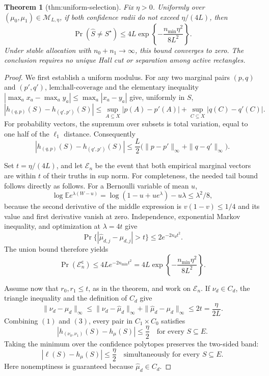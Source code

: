 \documentclass{article}
\newtheorem{theorem}{Theorem}
\begin{document}
\begin{theorem}[thm:uniform-selection]\label{thm:uniform-selection}
Fix \(\eta>0\). Uniformly over \((\mu_0,\mu_1)\in\mathcal M_{L,\eta}\), if both confidence radii do not exceed \(\eta/(4L)\), then \[\Pr(\widehat S\neq S^\star)\leq4L\exp\!\left\{-\frac{n_{\min}\eta^2}{8L^2}\right\}.\] Under stable allocation with \(n_0+n_1\to\infty\), this bound converges to zero. The conclusion requires no unique Hall cut or separation among active rectangles.
\end{theorem}
\begin{proof}
We first establish a uniform modulus.  For any two marginal pairs \((p,q)\) and \((p',q')\), \(\text{lem:hall-coverage}\) and the elementary inequality \(|\max_a x_a-\max_a y_a|\leq\max_a|x_a-y_a|\) give, uniformly in \(S\),
\[
|h_{(q,p)}(S)-h_{(q',p')}(S)|
\leq \sup_{A\subseteq X}|p(A)-p'(A)|
+\sup_{C\subseteq X}|q(C)-q'(C)|.
\]
For probability vectors, the supremum over subsets is total variation, equal to one half of the \(\ell_1\) distance.  Consequently
\[
|h_{(q,p)}(S)-h_{(q',p')}(S)|
\leq\frac L2\bigl(\|p-p'\|_\infty+\|q-q'\|_\infty\bigr). \tag{1}
\]

Set \(t=\eta/(4L)\), and let \(\mathcal E_n\) be the event that both empirical marginal vectors are within \(t\) of their truths in sup norm.  For completeness, the needed tail bound follows directly as follows.  For a Bernoulli variable of mean \(u\),
\[
\log\mathbb E e^{\lambda(W-u)}
=\log(1-u+ue^\lambda)-u\lambda\leq\lambda^2/8,
\]
because the second derivative of the middle expression is \(v(1-v)\leq1/4\) and its value and first derivative vanish at zero.  Independence, exponential Markov inequality, and optimization at \(\lambda=4t\) give
\[
\Pr\{|\widehat\mu_{d,j}-\mu_{d,j}|>t\}\leq2e^{-2n_dt^2}.
\]
The union bound therefore yields
\[
\Pr(\mathcal E_n^{\mathsf c})
\leq4L e^{-2n_{\min}t^2}
=4L\exp\!\left\{-\frac{n_{\min}\eta^2}{8L^2}\right\}. \tag{2}
\]

Assume now that \(r_0,r_1\leq t\), as in the theorem, and work on \(\mathcal E_n\).  If \(\nu_d\in C_d\), the triangle inequality and the definition of \(C_d\) give
\[
\|\nu_d-\mu_d\|_\infty
\leq\|\nu_d-\widehat\mu_d\|_\infty
+\|\widehat\mu_d-\mu_d\|_\infty
\leq2t=\frac{\eta}{2L}. \tag{3}
\]
Combining \((1)\) and \((3)\), every pair in \(C_1\times C_0\) satisfies
\[
|h_{(\nu_0,\nu_1)}(S)-h_{\mu}(S)|\leq\frac\eta2
\quad\text{for every }S\subseteq E.
\]
Taking the minimum over the confidence polytopes preserves the two-sided band:
\[
|\ell(S)-h_{\mu}(S)|\leq\frac\eta2
\quad\text{simultaneously for every }S\subseteq E. \tag{4}
\]
Here nonemptiness is guaranteed because \(\widehat\mu_d\in C_d\).


\end{proof}
\end{document}
